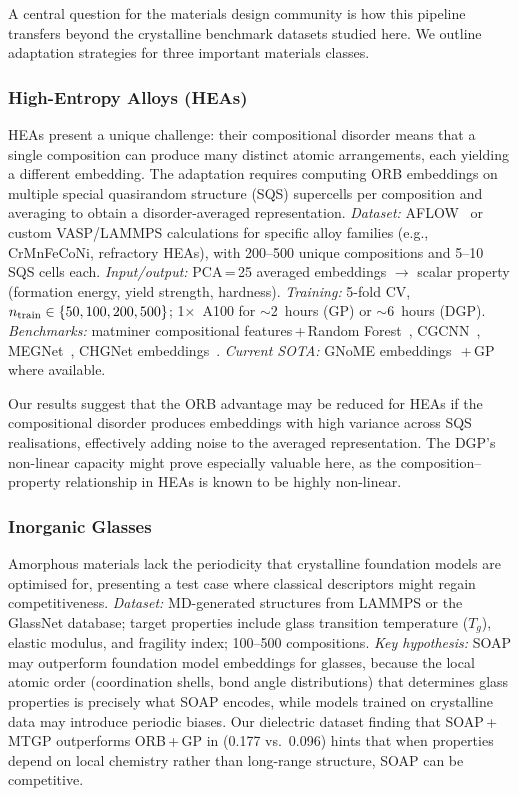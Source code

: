 A central question for the materials design community is how this pipeline transfers beyond the crystalline benchmark datasets studied here.
We outline adaptation strategies for three important materials classes.

\subsubsection{High-Entropy Alloys (HEAs)}

HEAs present a unique challenge: their compositional disorder means that a single composition can produce many distinct atomic arrangements, each yielding a different embedding.
The adaptation requires computing ORB embeddings on multiple special quasirandom structure (SQS) supercells per composition and averaging to obtain a disorder-averaged representation.
\emph{Dataset:} AFLOW~\cite{curtarolo2012aflow} or custom VASP/LAMMPS calculations for specific alloy families (e.g., CrMnFeCoNi, refractory HEAs), with 200--500 unique compositions and 5--10 SQS cells each.
\emph{Input/output:} PCA\,=\,25 averaged embeddings $\rightarrow$ scalar property (formation energy, yield strength, hardness).
\emph{Training:} 5-fold CV, $n_{\text{train}} \in \{50, 100, 200, 500\}$; 1$\times$~A100 for $\sim$2~hours (GP) or $\sim$6~hours (DGP).
\emph{Benchmarks:} matminer compositional features\,+\,Random Forest~\cite{ward2016general}, CGCNN~\cite{xie2018crystal}, MEGNet~\cite{chen2019graph}, CHGNet embeddings~\cite{deng2023chgnet}.
\emph{Current SOTA:} GNoME embeddings~\cite{merchant2023scaling}\,+\,GP where available.

Our results suggest that the ORB advantage may be reduced for HEAs if the compositional disorder produces embeddings with high variance across SQS realisations, effectively adding noise to the averaged representation.
The DGP's non-linear capacity might prove especially valuable here, as the composition--property relationship in HEAs is known to be highly non-linear.

\subsubsection{Inorganic Glasses}

Amorphous materials lack the periodicity that crystalline foundation models are optimised for, presenting a test case where classical descriptors might regain competitiveness.
\emph{Dataset:} MD-generated structures from LAMMPS or the GlassNet database; target properties include glass transition temperature ($T_g$), elastic modulus, and fragility index; 100--500 compositions.
\emph{Key hypothesis:} SOAP may outperform foundation model embeddings for glasses, because the local atomic order (coordination shells, bond angle distributions) that determines glass properties is precisely what SOAP encodes, while models trained on crystalline data may introduce periodic biases.
Our dielectric dataset finding that SOAP\,+\,MTGP outperforms ORB\,+\,GP in \Rtwo{} (0.177 vs.\ 0.096) hints that when properties depend on local chemistry rather than long-range structure, SOAP can be competitive.

